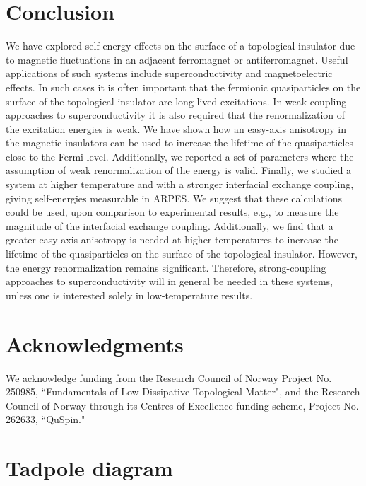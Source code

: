 \documentclass[aps, prb, twocolumn,amsmath,amssymb,floatfix]{revtex4-2}
\begin{document}
\section{Conclusion} \label{sec:Con}
We have explored self-energy effects on the surface of a topological insulator due to magnetic fluctuations in an adjacent ferromagnet or antiferromagnet. Useful applications of such systems include superconductivity and magnetoelectric effects. In such cases it is often important that the fermionic quasiparticles on the surface of the topological insulator are long-lived excitations. In weak-coupling approaches to superconductivity it is also required that the renormalization of the excitation energies is weak. We have shown how an easy-axis anisotropy in the magnetic insulators can be used to increase the lifetime of the quasiparticles close to the Fermi level. Additionally, we reported a set of parameters where the assumption of weak renormalization of the energy is valid. 
Finally, we studied a system at higher temperature and with a stronger interfacial exchange coupling, giving self-energies measurable in ARPES. We suggest that these calculations could be used, upon comparison to experimental results, e.g., to measure the magnitude of the interfacial exchange coupling. 
Additionally, we find that a greater easy-axis anisotropy is needed at higher temperatures to increase the lifetime of the quasiparticles on the surface of the topological insulator. However, the energy renormalization remains significant. 
Therefore, strong-coupling approaches to superconductivity will in general be needed in these systems, unless one is interested solely in low-temperature results.  

\section*{Acknowledgments}
We acknowledge funding from 
the Research Council of Norway Project No. 250985, ``Fundamentals of Low-Dissipative Topological Matter", and  
the Research Council of Norway through its Centres of Excellence funding scheme, Project No. 262633, ``QuSpin." 




\appendix


\section{Tadpole diagram} \label{sec:tadpole}
\end{document}

